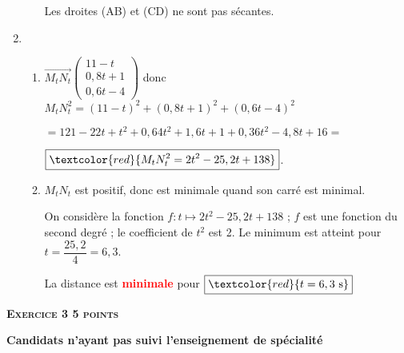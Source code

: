 \documentclass[12pt]{article}
\begin{document}
\begin{enumerate}
\begin{enumerate}
		Les droites (AB) et (CD) ne sont pas sécantes.
	\end{enumerate}
\item
	\begin{enumerate}
		\item %
		$\overrightarrow{M_tN_t}\begin{pmatrix}11-t\\0,8t+1\\0,6t-4\end{pmatrix}$ donc $M_tN_t^2= (11 - t)^2 + (0,8t + 1)^2+(0,6t - 4)^2$
		
$=121 - 22t + t^2 + 0,64t^2+ 1,6t + 1+ 0,36t^2-4,8t + 16 =$
		
$\boxed{\textcolor{red}{M_tN_t^2 = 2t^2-25,2t+138}}$.
		
		\item %
		$M_tN_t$ est positif, donc est minimale quand son carré est minimal.
		
		\noindent On considère la fonction $f:t\mapsto 2t^2-25,2t+138$ ; $f$ est une fonction du second degré ; le coefficient de $t^2$ est 2. Le minimum est atteint pour $t=\dfrac{25,2}{4}=6,3$.
		
		\noindent La distance est \textbf{\textcolor{red}{minimale}} pour $\boxed{\textcolor{red}{t=6,3~ \text{s}}}$
	\end{enumerate}
\end{enumerate}

\vspace{0,5cm}

\textbf{\textsc{Exercice 3 \hfill 5 points}}

\textbf{Candidats n'ayant pas suivi l'enseignement de spécialité} 

\medskip
\end{document}
